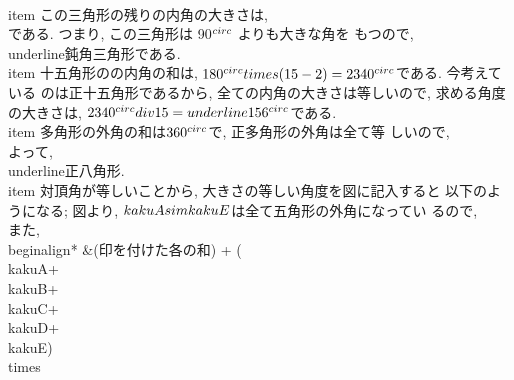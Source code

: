 	\\item この三角形の残りの内角の大きさは,
	      \\[
	       180^{\\circ}-(49^{\\circ}+28^{\\circ})=103^{\\circ}
	      \\]
	      である. つまり, この三角形は 90$^{\\circ}$ よりも大きな角を
	      もつので, \\underline{鈍角三角形}である.
	\\item 十五角形のの内角の和は,
	      $180^{\\circ}\\times(15-2)=2340^{\\circ}$である. 今考えている
	      のは正十五角形であるから, 全ての内角の大きさは等しいので,
	      求める角度の大きさは,
	      $2340^{\\circ}\\div15=\\underline{156^{\\circ}}$である.
	\\item 多角形の外角の和は$360^{\\circ}$で, 正多角形の外角は全て等
	      しいので,
	      \\[
	       360 \\div 45^{\\circ}=8
	      \\]
	      よって, \\underline{正八角形}.
	\\item 対頂角が等しいことから, 大きさの等しい角度を図に記入すると
	      以下のようになる;
	      図より, $\\kaku{A}\\sim\\kaku{E}$は全て五角形の外角になってい
	      るので, 
	      \\[
	       \\kaku{A}+\\kaku{B}+\\kaku{C}+\\kaku{D}+\\kaku{E}=360^{\\circ}
	      \\]
	      また,
	      \\begin{align*}
       	       &(印を付けた各の和) +
	      (\\kaku{A}+\\kaku{B}+\\kaku{C}+\\kaku{D}+\\kaku{E})\\times
